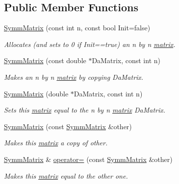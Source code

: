 \subsection*{Public Member Functions}
\begin{DoxyCompactItemize}
\item 
\hyperlink{classJKBuilder_1_1SymmMatrix_a0232cfa05984c1f35917eff2a56a77dc}{SymmMatrix} (const int n, const bool Init=false)
\begin{DoxyCompactList}\small\item\em Allocates (and sets to 0 if Init==true) an n by n \hyperlink{classJKBuilder_1_1matrix}{matrix}. \item\end{DoxyCompactList}\item 
\hyperlink{classJKBuilder_1_1SymmMatrix_a772cb659e7f24da6add4891fe3a176e2}{SymmMatrix} (const double $\ast$DaMatrix, const int n)
\begin{DoxyCompactList}\small\item\em Makes an n by n \hyperlink{classJKBuilder_1_1matrix}{matrix} by copying DaMatrix. \item\end{DoxyCompactList}\item 
\hyperlink{classJKBuilder_1_1SymmMatrix_a485694eb867a2f935521aa7cc869dd25}{SymmMatrix} (double $\ast$DaMatrix, const int n)
\begin{DoxyCompactList}\small\item\em Sets this \hyperlink{classJKBuilder_1_1matrix}{matrix} equal to the n by n \hyperlink{classJKBuilder_1_1matrix}{matrix} DaMatrix. \item\end{DoxyCompactList}\item 
\hyperlink{classJKBuilder_1_1SymmMatrix_aee15e64745fb95965ac5a526a70a7330}{SymmMatrix} (const \hyperlink{classJKBuilder_1_1SymmMatrix}{SymmMatrix} \&other)
\begin{DoxyCompactList}\small\item\em Makes this \hyperlink{classJKBuilder_1_1matrix}{matrix} a copy of other. \item\end{DoxyCompactList}\item 
\hyperlink{classJKBuilder_1_1SymmMatrix}{SymmMatrix} \& \hyperlink{classJKBuilder_1_1SymmMatrix_aca4a8297278ff39c5422febf1dcbc5ac}{operator=} (const \hyperlink{classJKBuilder_1_1SymmMatrix}{SymmMatrix} \&other)
\begin{DoxyCompactList}\small\item\em Makes this \hyperlink{classJKBuilder_1_1matrix}{matrix} equal to the other one. \item\end{DoxyCompactList}\item 

\end{DoxyCompactItemize}

